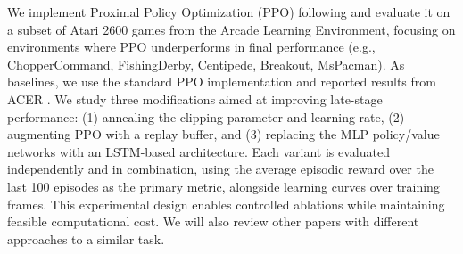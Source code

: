 \documentclass[12pt,letterpaper]{article}
\begin{document}


We implement Proximal Policy Optimization (PPO) following \cite{PPOPaper} and evaluate it on a subset of Atari 2600 games from the Arcade Learning Environment, focusing on environments where PPO underperforms in final performance (e.g., ChopperCommand, FishingDerby, Centipede, Breakout, MsPacman). As baselines, we use the standard PPO implementation and reported results from ACER \cite{ACERPaper}. We study three modifications aimed at improving late-stage performance: (1) annealing the clipping parameter and learning rate, (2) augmenting PPO with a replay buffer, and (3) replacing the MLP policy/value networks with an LSTM-based architecture. Each variant is evaluated independently and in combination, using the average episodic reward over the last 100 episodes as the primary metric, alongside learning curves over training frames. This experimental design enables controlled ablations while maintaining feasible computational cost. We will also review other papers with different approaches to a similar task. \cite{recurrmodel,andry}


\vfill \newpage


\end{document}

